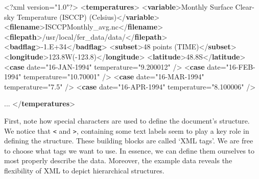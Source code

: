\documentclass[
  12pt,
]{style/krantz}
\newenvironment{Shaded}{\begin{snugshade}}{\end{snugshade}}
\newcommand{\FunctionTok}[1]{\textcolor[rgb]{0.00,0.00,0.00}{#1}}
\newcommand{\KeywordTok}[1]{\textcolor[rgb]{0.13,0.29,0.53}{\textbf{#1}}}
\newcommand{\NormalTok}[1]{#1}
\newcommand{\OtherTok}[1]{\textcolor[rgb]{0.56,0.35,0.01}{#1}}
\newcommand{\StringTok}[1]{\textcolor[rgb]{0.31,0.60,0.02}{#1}}
\begin{document}
\begin{Shaded}
\begin{Highlighting}[]
\FunctionTok{\textless{}?xml}\OtherTok{ version=}\StringTok{"1.0"}\FunctionTok{?\textgreater{}}
\NormalTok{  \textless{}}\KeywordTok{temperatures}\NormalTok{\textgreater{}}
\NormalTok{    \textless{}}\KeywordTok{variable}\NormalTok{\textgreater{}Monthly Surface Clear{-}sky Temperature (ISCCP) (Celsius)\textless{}/}\KeywordTok{variable}\NormalTok{\textgreater{}}
\NormalTok{    \textless{}}\KeywordTok{filename}\NormalTok{\textgreater{}ISCCPMonthly\_avg.nc\textless{}/}\KeywordTok{filename}\NormalTok{\textgreater{}}
\NormalTok{    \textless{}}\KeywordTok{filepath}\NormalTok{\textgreater{}/usr/local/fer\_data/data/\textless{}/}\KeywordTok{filepath}\NormalTok{\textgreater{}}
\NormalTok{    \textless{}}\KeywordTok{badflag}\NormalTok{\textgreater{}{-}1.E+34\textless{}/}\KeywordTok{badflag}\NormalTok{\textgreater{}}
\NormalTok{    \textless{}}\KeywordTok{subset}\NormalTok{\textgreater{}48 points (TIME)\textless{}/}\KeywordTok{subset}\NormalTok{\textgreater{}}
\NormalTok{    \textless{}}\KeywordTok{longitude}\NormalTok{\textgreater{}123.8W({-}123.8)\textless{}/}\KeywordTok{longitude}\NormalTok{\textgreater{}}
\NormalTok{    \textless{}}\KeywordTok{latitude}\NormalTok{\textgreater{}48.8S\textless{}/}\KeywordTok{latitude}\NormalTok{\textgreater{}}
\NormalTok{    \textless{}}\KeywordTok{case}\OtherTok{ date=}\StringTok{"16{-}JAN{-}1994"}\OtherTok{ temperature=}\StringTok{"9.200012"}\NormalTok{ /\textgreater{}}
\NormalTok{    \textless{}}\KeywordTok{case}\OtherTok{ date=}\StringTok{"16{-}FEB{-}1994"}\OtherTok{ temperature=}\StringTok{"10.70001"}\NormalTok{ /\textgreater{}}
\NormalTok{    \textless{}}\KeywordTok{case}\OtherTok{ date=}\StringTok{"16{-}MAR{-}1994"}\OtherTok{ temperature=}\StringTok{"7.5"}\NormalTok{ /\textgreater{}}
\NormalTok{    \textless{}}\KeywordTok{case}\OtherTok{ date=}\StringTok{"16{-}APR{-}1994"}\OtherTok{ temperature=}\StringTok{"8.100006"}\NormalTok{ /\textgreater{}}

\NormalTok{...}
\NormalTok{  \textless{}/}\KeywordTok{temperatures}\NormalTok{\textgreater{}}
\end{Highlighting}
\end{Shaded}

First, note how special characters are used to define the document's structure. We notice that \texttt{\textless{}} and \texttt{\textgreater{}}, containing some text labels seem to play a key role in defining the structure. These building blocks are called `XML tags'. We are free to choose what tags we want to use. In essence, we can define them ourselves to most properly describe the data. Moreover, the example data reveals the flexibility of XML to depict hierarchical structures.
\end{document}
